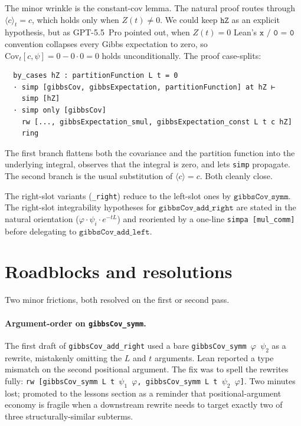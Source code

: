 \documentclass[11pt]{article}
\begin{document}
The minor wrinkle is the constant-cov lemma. The natural proof routes
through $\langle c\rangle_t = c$, which holds only when $Z(t) \neq 0$.
We could keep $\texttt{hZ}$ as an explicit hypothesis, but as
GPT-5.5~Pro pointed out, when $Z(t) = 0$ Lean's
$\texttt{x / 0 = 0}$ convention collapses every Gibbs expectation to
zero, so $\mathrm{Cov}_t[c, \psi] = 0 - 0 \cdot 0 = 0$ holds
unconditionally. The proof case-splits:
\begin{verbatim}
  by_cases hZ : partitionFunction L t = 0
  · simp [gibbsCov, gibbsExpectation, partitionFunction] at hZ ⊢
    simp [hZ]
  · simp only [gibbsCov]
    rw [..., gibbsExpectation_smul, gibbsExpectation_const L t c hZ]
    ring
\end{verbatim}
The first branch flattens both the covariance and the partition
function into the underlying integral, observes that the integral is
zero, and lets \texttt{simp} propagate. The second branch is the usual
substitution of $\langle c\rangle = c$. Both cleanly close.

The right-slot variants (\texttt{\_right}) reduce to the left-slot
ones by $\texttt{gibbsCov\_symm}$. The right-slot integrability
hypotheses for $\texttt{gibbsCov\_add\_right}$ are stated in the
natural orientation (\texttt{$\varphi \cdot \psi_i \cdot e^{-tL}$})
and reoriented by a one-line \texttt{simpa [mul\_comm]} before
delegating to $\texttt{gibbsCov\_add\_left}$.

\section{Roadblocks and resolutions}

Two minor frictions, both resolved on the first or second pass.

\paragraph{Argument-order on \texttt{gibbsCov\_symm}.} The first
draft of \texttt{gibbsCov\_add\_right} used a bare
\texttt{gibbsCov\_symm $\varphi$ $\psi_2$} as a rewrite, mistakenly
omitting the $L$ and $t$ arguments. Lean reported a type mismatch on
the second positional argument. The fix was to spell the rewrites
fully: \texttt{rw [gibbsCov\_symm L t $\psi_1$ $\varphi$, gibbsCov\_symm L t $\psi_2$ $\varphi$]}.
Two minutes lost; promoted to the lessons section as a reminder that
positional-argument economy is fragile when a downstream rewrite
needs to target exactly two of three structurally-similar subterms.
\end{document}
